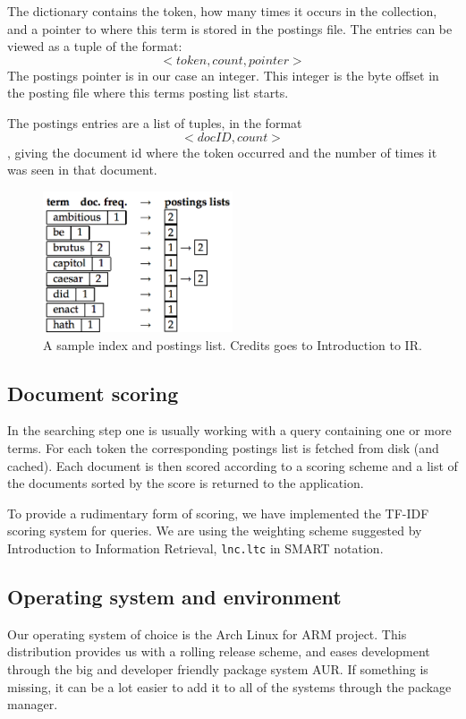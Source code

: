 The dictionary contains the token, how many times it occurs in the collection, and a pointer to where this term is stored in the postings file.
The entries can be viewed as a tuple of the format:
$$<token, count, pointer>$$
The postings pointer is in our case an integer. This integer is the byte offset in the posting file where this terms posting list starts.

The postings entries are a list of tuples, in the format $$<docID, count>$$, giving the document id where the token occurred and the number of times it was seen in that document.

\begin{figure}[h]
    \center
    \includegraphics[width=0.5\textwidth]{software/index_postings_lists}
    \caption{A sample index and postings list. Credits goes to Introduction to IR\cite{IntroIR}.}
    \label{fig:index_postings_lists_sw}
\end{figure}

\subsection{Document scoring}
In the searching step one is usually working with a query containing one or more terms. For each token the corresponding postings list is fetched from disk (and cached). Each document is then scored according to a scoring scheme and a list of the documents sorted by the score is returned to the application.

To provide a rudimentary form of scoring, we have implemented the TF-IDF scoring system for queries. We are using the weighting scheme suggested by Introduction to Information Retrieval\cite{IntroIR}, {\tt lnc.ltc} in SMART notation\cite{tfidfsmart}.


\subsection{Operating system and environment}
Our operating system of choice is the Arch Linux for ARM project\cite{archarm}. This distribution provides us with a rolling release scheme, and eases development through the big and developer friendly package system AUR. If something is missing, it can be a lot easier to add it to all of the systems through the package manager.

